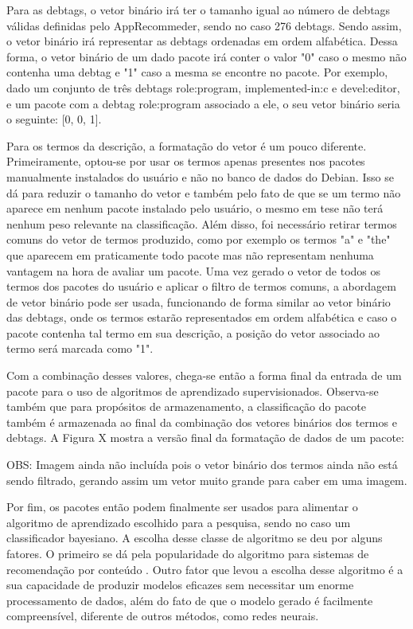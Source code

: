 Para as debtags, o vetor binário irá ter o tamanho igual ao número de debtags
válidas definidas pelo AppRecommeder, sendo no caso 276 debtags. Sendo assim, o
vetor binário irá representar as debtags ordenadas em ordem alfabética. Dessa forma,
o vetor binário de um dado pacote irá conter o valor "0" caso o mesmo não contenha uma debtag e "1" caso a mesma se encontre
no pacote. Por exemplo, dado um conjunto de três debtags role:program, implemented-in:c e devel:editor, e um pacote com a debtag
role:program associado a ele, o seu vetor binário seria o seguinte: [0, 0, 1].

Para os termos da descrição, a formatação do vetor é um pouco diferente. Primeiramente, optou-se por usar os termos apenas presentes
nos pacotes manualmente instalados do usuário e não no banco de dados do Debian. Isso se dá para reduzir o tamanho do vetor e também
pelo fato de que se um termo não aparece em nenhum pacote instalado pelo usuário, o mesmo em tese não terá nenhum peso relevante na
classificação. Além disso, foi necessário retirar termos comuns do vetor de termos produzido, como por exemplo os termos "a" e "the" que
aparecem em praticamente todo pacote mas não representam nenhuma vantagem na hora de avaliar um pacote. Uma vez gerado o vetor de todos os
termos dos pacotes do usuário e aplicar o filtro de termos comuns, a abordagem de vetor binário pode ser usada, funcionando de forma
similar ao vetor binário das debtags, onde os termos estarão representados em ordem alfabética e caso o pacote contenha tal termo em sua
descrição, a posição do vetor associado ao termo será marcada como "1".

Com a combinação desses valores, chega-se então a forma final da entrada de um pacote para o uso de algoritmos de aprendizado
supervisionados. Observa-se também que para propósitos de armazenamento, a classificação do pacote também é armazenada ao final da combinação
dos vetores binários dos termos e debtags. A Figura X mostra a versão final da formatação de dados de um pacote:

OBS: Imagem ainda não incluída pois o vetor binário dos termos ainda não está
sendo filtrado, gerando assim um vetor muito grande para caber em uma imagem.

Por fim, os pacotes então podem finalmente ser usados para alimentar o algoritmo de aprendizado escolhido para a pesquisa, sendo no caso um
classificador bayesiano. A escolha desse classe de algoritmo se deu por alguns fatores. O primeiro se dá pela popularidade do algoritmo para
sistemas de recomendação por conteúdo \cite{amatriain2011data}. Outro fator que levou a escolha desse algoritmo é a sua capacidade de produzir
modelos eficazes sem necessitar um enorme processamento de dados, além do fato
de que o modelo gerado é facilmente compreensível, diferente de outros métodos,
como redes neurais\cite{segaran2007programming}.

